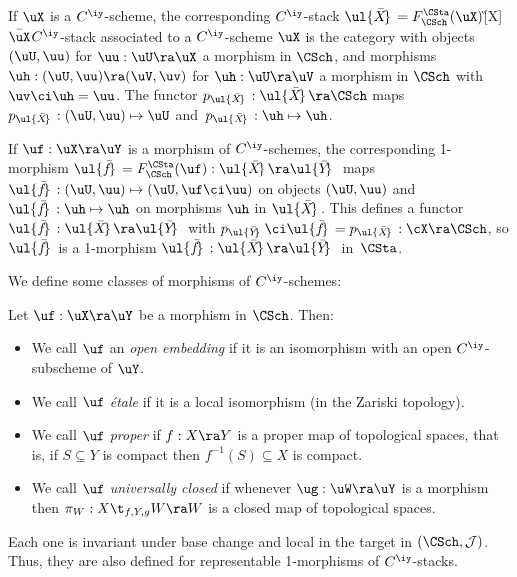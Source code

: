 \documentclass{article}
\begin{document}
\begin{dfn}
If $\uX$ is a $C^\iy$-scheme, the corresponding $C^\iy$-stack
$\ul{\bar X\!}\,=F_\CSch^\CSta(\uX)$\G[X]{$\bar\uX$}{$C^\iy$-stack
associated to a $C^\iy$-scheme $\uX$} is the category with objects
$(\uU,\uu)$ for $\uu:\uU\ra\uX$ a morphism in $\CSch$, and morphisms
$\uh:(\uU,\uu)\ra(\uV,\uv)$ for $\uh:\uU\ra\uV$ a morphism in
$\CSch$ with $\uv\ci\uh=\uu$. The functor $p_{\smash{\ul{\bar
X\!}\,}}: \ul{\bar X\!}\,\ra\CSch$ maps $p_{\smash{\ul{\bar
X\!}\,}}:(\uU,\uu)\mapsto\uU$ and~$p_{\smash{\ul{\bar
X\!}\,}}:\uh\mapsto\uh$.

If $\uf:\uX\ra\uY$ is a morphism of $C^\iy$-schemes, the
corresponding 1-morphism $\ul{\bar f\!}\,=F_\CSch^\CSta(\uf):
\ul{\bar X\!}\,\ra\ul{\bar Y\!\!}\,\,$ maps $\ul{\bar
f\!}\,:(\uU,\uu)\mapsto (\uU,\uf\ci\uu)$ on objects $(\uU,\uu)$ and
$\ul{\bar f\!}\,:\uh\mapsto\uh$ on morphisms $\uh$ in $\ul{\bar
X\!}\,$. This defines a functor $\ul{\bar f\!}\,:\ul{\bar X\!}\,
\ra\ul{\bar Y\!\!}\,\,$ with $p_{\smash{\ul{\bar Y\!\!}\,\,}}\ci
\ul{\bar f\!}\,=p_{\smash{\ul{\bar X\!}\,}}:\cX\ra \CSch$, so
$\ul{\bar f\!}\,$ is a 1-morphism $\ul{\bar f\!}\,:\ul{\bar X\!}\,
\ra\ul{\bar Y\!\!}\,\,$ in~$\CSta$.
\label{ds8def1}
\end{dfn}

We define some classes of morphisms of $C^\iy$-schemes:

\begin{dfn} Let $\uf:\uX\ra\uY$ be a
morphism in $\CSch$. Then:
\begin{itemize}
\setlength{\itemsep}{0pt}
\setlength{\parsep}{0pt}
\item We call $\uf$ an {\it open
embedding\/} if it is
an isomorphism with an open $C^\iy$-subscheme of $\uY$.
\item We call $\uf$ {\it
\'etale\/} if it is a local isomorphism (in the Zariski
topology).
\item We call $\uf$ {\it
proper\/} if $f:X\ra
Y$ is a proper map of topological spaces, that is, if
$S\subseteq Y$ is compact then $f^{-1}(S)\subseteq X$ is
compact.
\item We call $\uf$ {\it universally
closed\/}
if whenever $\ug:\uW\ra\uY$ is a morphism then
$\pi_W:X\t_{f,Y,g}W\ra W$ is a closed map of topological spaces.
\end{itemize}
Each one is invariant under base change and local in the target in
$(\CSch,{\cal J})$. Thus, they are also defined for representable
1-morphisms of $C^\iy$-stacks.
\label{ds8def2}
\end{dfn}
\end{document}

